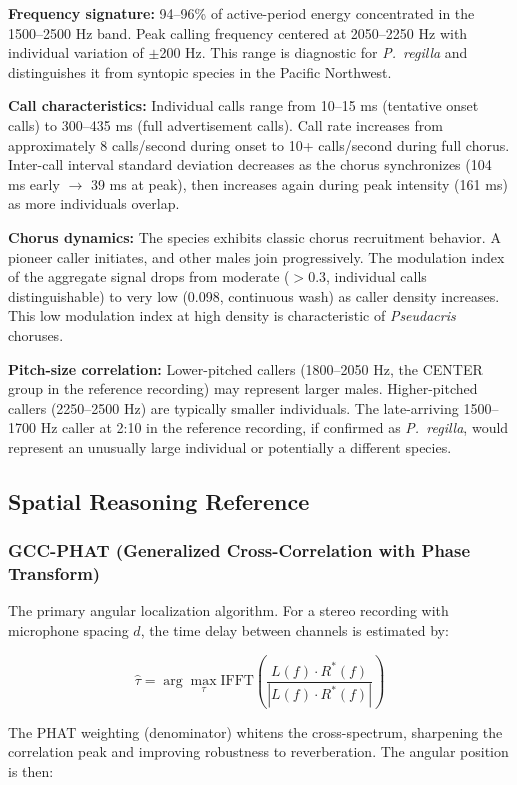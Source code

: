 \documentclass[11pt,letterpaper]{article}
\begin{document}
\textbf{Frequency signature:} 94--96\% of active-period energy concentrated in the 1500--2500 Hz band. Peak calling frequency centered at 2050--2250 Hz with individual variation of $\pm$200 Hz. This range is diagnostic for \textit{P.~regilla} and distinguishes it from syntopic species in the Pacific Northwest.

\textbf{Call characteristics:} Individual calls range from 10--15 ms (tentative onset calls) to 300--435 ms (full advertisement calls). Call rate increases from approximately 8 calls/second during onset to 10+ calls/second during full chorus. Inter-call interval standard deviation decreases as the chorus synchronizes (104 ms early $\rightarrow$ 39 ms at peak), then increases again during peak intensity (161 ms) as more individuals overlap.

\textbf{Chorus dynamics:} The species exhibits classic chorus recruitment behavior. A pioneer caller initiates, and other males join progressively. The modulation index of the aggregate signal drops from moderate ($>$0.3, individual calls distinguishable) to very low (0.098, continuous wash) as caller density increases. This low modulation index at high density is characteristic of \textit{Pseudacris} choruses.

\textbf{Pitch-size correlation:} Lower-pitched callers (1800--2050 Hz, the CENTER group in the reference recording) may represent larger males. Higher-pitched callers (2250--2500 Hz) are typically smaller individuals. The late-arriving 1500--1700 Hz caller at 2:10 in the reference recording, if confirmed as \textit{P.~regilla}, would represent an unusually large individual or potentially a different species.

\subsection{Spatial Reasoning Reference}

\subsubsection{GCC-PHAT (Generalized Cross-Correlation with Phase Transform)}

The primary angular localization algorithm. For a stereo recording with microphone spacing $d$, the time delay between channels is estimated by:

$$\hat{\tau} = \arg\max_\tau \text{IFFT}\left(\frac{L(f) \cdot R^*(f)}{|L(f) \cdot R^*(f)|}\right)$$

The PHAT weighting (denominator) whitens the cross-spectrum, sharpening the correlation peak and improving robustness to reverberation. The angular position is then:
\end{document}
